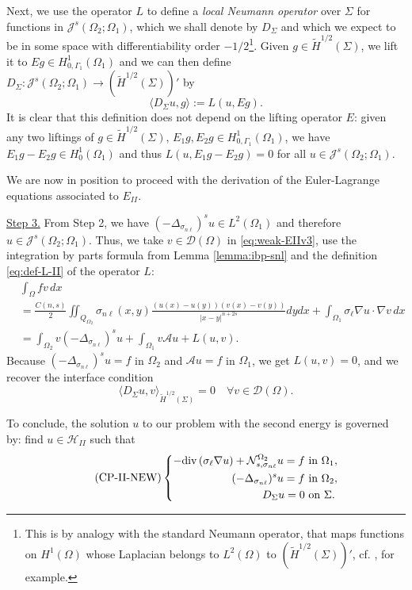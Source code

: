 \documentclass{amsart}
\newcommand{\Ol}{\Omega_{1}}%
\newcommand{\Onl}{\Omega_{2}}%
\newcommand{\Gl}{{\Gamma_1}}%
\renewcommand{\sl}{{\sigma_\ell}}
\newcommand{\snl}{{\sigma_{n\ell}}}
\newcommand{\Nsnl}{\mathcal{N}_{s,\snl}}
\renewcommand{\div}{{\rm div}\,}
\theoremstyle{plain}
\numberwithin{equation}{section}
\numberwithin{table}{section}
\numberwithin{figure}{section}
\numberwithin{theorem}{section}
\numberwithin{corollary}{section}
\numberwithin{definition}{section}
\numberwithin{lemma}{section}
\numberwithin{proposition}{section}
\numberwithin{remark}{section}
\begin{document}
Next, we use the operator $L$  to define a {\em local Neumann operator} over $\Sigma$ for functions in $\mathcal{J}^s(\Onl;\Ol)$, which we shall denote by $D_\Sigma$ and which we expect to be in some space with differentiability order $-1/2$\footnote{This is by analogy with the standard Neumann operator, that maps functions on $H^1(\Omega)$ whose Laplacian belongs to $L^2(\Omega)$ to $(\widetilde{H}^{1/2}(\Sigma))'$, cf. \cite[Chap. 6]{Sayas-book}, for example.}. Given $g \in \widetilde{H}^{1/2}(\Sigma)$, we lift it to $Eg \in H^1_{0,\Gl}(\Ol)$ and we can then define $D_\Sigma \colon\mathcal{J}^s(\Onl;\Ol) \to (\widetilde{H}^{1/2}(\Sigma))'$ by 
\[
\langle D_\Sigma u , g \rangle := L(u,Eg).
\]
It is clear that this definition does not depend on the lifting operator $E$:  given any two liftings of $g \in \widetilde{H}^{1/2}(\Sigma)$, $E_1 g, E_2 g \in H^1_{0,\Gl}(\Ol)$, we have $E_1 g - E_2 g \in H^1_0(\Ol)$ and thus $L(u,E_1g - E_2 g) = 0$ for all $u \in \mathcal{J}^s(\Onl;\Ol)$.

\smallskip

We are now in position to proceed with the derivation of the Euler-Lagrange equations associated to $E_{II}$. 

\smallskip

\noindent
\underline{Step 3.} From Step 2, we have $(-\Delta_\snl)^s u \in L^2(\Ol)$ and therefore $u \in \mathcal{J}^s(\Onl;\Ol)$. Thus,
we take $v \in \mathcal{D}(\Omega)$ in \eqref{eq:weak-EIIv3}, use the integration by parts formula from Lemma \ref{lemma:ibp-snl} 
and the definition \eqref{eq:def-L-II} of the operator $L$:
\[ \begin{split}
& \int_\Omega f v \, dx \\
& = \frac{C(n,s)}{2} \iint_{Q_{\Onl}} \snl(x,y) \frac{(u(x)-u(y))(v(x)-v(y))}{|x-y|^{n+2s}} dy dx + \int_{\Ol}  \sl \nabla u \cdot \nabla v\, dx \\
& = \int_{\Onl} v (-\Delta_\snl)^s u + \int_{\Ol} v \mathcal{A} u + L(u, v) .
\end{split} \]
Because $(-\Delta_\snl)^s u = f$ in $\Onl$ and $\mathcal{A} u = f$ in $\Ol$, we get $L(u, v) = 0$, and we recover the interface condition
\[
\langle D_\Sigma u , v \rangle_{ \widetilde{H}^{1/2}(\Sigma)}  = 0 \quad \forall v \in \mathcal{D}(\Omega).
\]

To conclude, the solution $u$ to our problem with the second energy is governed by:
find $u\in \mathcal{H}_{II}$ such that
\begin{equation}\label{eq:coupled_problemIII_NEW} \tag{CP-II-NEW}
 \left\lbrace \begin{aligned}
-\div (\sl \nabla u) + \Nsnl^{\Onl} u = f  & \mbox{ in } \Ol, \\
(-\Delta_\snl)^s u = f  & \mbox{ in } \Onl, \\
D_\Sigma u = 0 & \mbox{ on } \Sigma.
\end{aligned} \right.
\end{equation}
\end{document}
